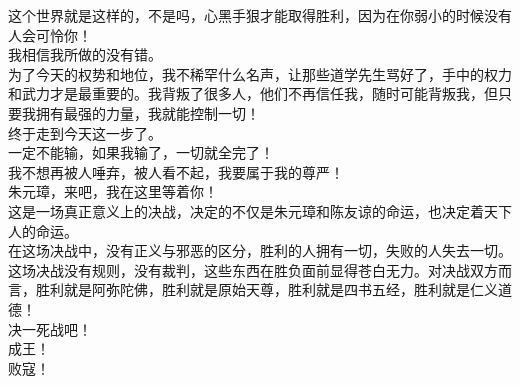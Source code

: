 \begin{multicols}{\theparacolNo}
这个世界就是这样的，不是吗，心黑手狠才能取得胜利，因为在你弱小的时候没有人会可怜你！\\

我相信我所做的没有错。\\

为了今天的权势和地位，我不稀罕什么名声，让那些道学先生骂好了，手中的权力和武力才是最重要的。我背叛了很多人，他们不再信任我，随时可能背叛我，但只要我拥有最强的力量，我就能控制一切！\\

终于走到今天这一步了。\\

一定不能输，如果我输了，一切就全完了！\\

我不想再被人唾弃，被人看不起，我要属于我的尊严！\\

朱元璋，来吧，我在这里等着你！\\

这是一场真正意义上的决战，决定的不仅是朱元璋和陈友谅的命运，也决定着天下人的命运。\\

在这场决战中，没有正义与邪恶的区分，胜利的人拥有一切，失败的人失去一切。\\

这场决战没有规则，没有裁判，这些东西在胜负面前显得苍白无力。对决战双方而言，胜利就是阿弥陀佛，胜利就是原始天尊，胜利就是四书五经，胜利就是仁义道德！\\

决一死战吧！\\

成王！\\

败寇！\\
\ifnum{}
	\end{multicols}
\fi
\newpage
